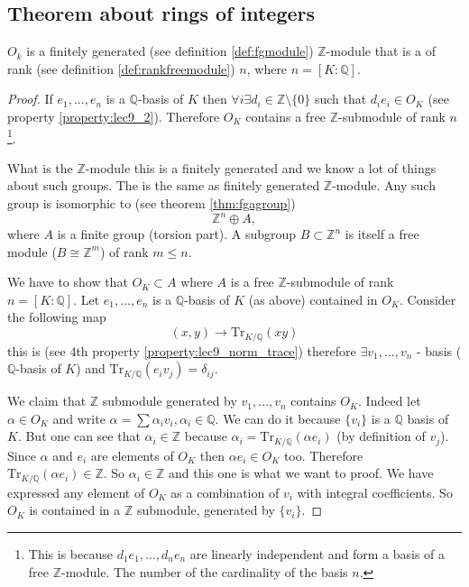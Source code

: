 \subsection{Theorem about rings of integers}
\begin{theorem}
  $O_k$ is a finitely generated (see definition \ref{def:fgmodule})
  $\mathbb{Z}$-module that is a  of
  rank (see definition \ref{def:rankfreemodule}) $n$, where $n=
  \left[K:\mathbb{Q}\right]$. 
  \begin{proof}
    If $e_1, \dots, e_n$ is a $\mathbb{Q}$-basis of $K$ then
    $\forall i \exists d_i \in \mathbb{Z} \setminus
    \{0\}$ such that $d_i e_i \in O_K$ (see property
    \ref{property:lec9_2}). Therefore $O_K$ contains a free
    $\mathbb{Z}$-submodule of rank $n$
    \footnote{
      This is because $d_1 e_1, \dots, d_n e_n$ are linearly
      independent and form a basis of a free $\mathbb{Z}$-module. The
      number of the cardinality of the basis $n$.
    }.

    What is the $\mathbb{Z}$-module this is a finitely generated
     and we know a lot of things about such
    groups. The  is the same as
    finitely generated $\mathbb{Z}$-module. Any such group is isomorphic
    to (see theorem \ref{thm:fgagroup})
    \[
    \mathbb{Z}^n \oplus A,
    \]
    where $A$ is a finite group (torsion part). A subgroup
    $B \subset \mathbb{Z}^n$ is itself a free module ($B \cong \mathbb{Z}^m$)
    of rank $m \le n$.

    We have to show that $O_K \subset A$ where $A$ is a free
    $\mathbb{Z}$-submodule of rank $n = \left[K:\mathbb{Q}\right]$.
    Let $e_1, \dots, e_n$ is a $\mathbb{Q}$-basis of $K$ (as above)
    contained in $O_K$. Consider the following map
    \[
    (x,y) \to \mathrm{Tr}_{K/\mathbb{Q}}\left(xy\right) 
    \]
    this is
     (see 4th property
    \ref{property:lec9_norm_trace}) therefore $\exists v_1, \dots,
    v_n$ -  basis ($\mathbb{Q}$-basis of $K$) and
    $\mathrm{Tr}_{K/\mathbb{Q}}\left(e_i v_j\right) = \delta_{ij}$.

    We claim that $\mathbb{Z}$ submodule generated by $v_1, \dots,
    v_n$ contains $O_K$. Indeed let $\alpha \in O_K$ and write
    \(
    \alpha = \sum \alpha_i v_i, \alpha_i \in \mathbb{Q}
    \). We can do it because $\{v_i\}$ is a $\mathbb{Q}$ basis of
    $K$. But one can see that $\alpha_i \in \mathbb{Z}$ because
    $\alpha_i = \mathrm{Tr}_{K/\mathbb{Q}}\left(\alpha e_i\right)$ (by
    definition of $v_j$). Since $\alpha$ and $e_i$ are elements of
    $O_K$ then $\alpha e_i \in O_K$ too. Therefore
    $\mathrm{Tr}_{K/\mathbb{Q}}\left(\alpha e_i\right) \in
    \mathbb{Z}$. So $\alpha_i \in \mathbb{Z}$ and this one is what we
    want to proof. We have expressed any element of $O_K$ as a
    combination of $v_i$ with integral coefficients. So $O_K$ is contained
    in a $\mathbb{Z}$ submodule, generated by $\{v_i\}$.  
  \end{proof}
  \label{thm:lec9_1}
\end{theorem}


